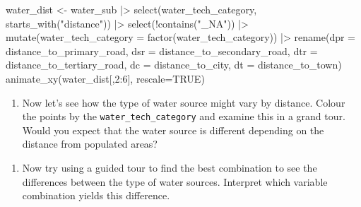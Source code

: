 \documentclass[
  letterpaper,
]{krantz}
\newenvironment{Shaded}{\begin{snugshade}}{\end{snugshade}}
\newcommand{\AttributeTok}[1]{\textcolor[rgb]{0.40,0.45,0.13}{#1}}
\newcommand{\ConstantTok}[1]{\textcolor[rgb]{0.56,0.35,0.01}{#1}}
\newcommand{\DecValTok}[1]{\textcolor[rgb]{0.68,0.00,0.00}{#1}}
\newcommand{\FunctionTok}[1]{\textcolor[rgb]{0.28,0.35,0.67}{#1}}
\newcommand{\NormalTok}[1]{\textcolor[rgb]{0.00,0.23,0.31}{#1}}
\newcommand{\OtherTok}[1]{\textcolor[rgb]{0.00,0.23,0.31}{#1}}
\newcommand{\SpecialCharTok}[1]{\textcolor[rgb]{0.37,0.37,0.37}{#1}}
\newcommand{\StringTok}[1]{\textcolor[rgb]{0.13,0.47,0.30}{#1}}
\providecommand{\tightlist}{%
  \setlength{\itemsep}{0pt}\setlength{\parskip}{0pt}}
\begin{document}
\begin{Shaded}
\begin{Highlighting}[]
\NormalTok{water\_dist }\OtherTok{\textless{}{-}}\NormalTok{ water\_sub }\SpecialCharTok{|\textgreater{}}
  \FunctionTok{select}\NormalTok{(water\_tech\_category, }\FunctionTok{starts\_with}\NormalTok{(}\StringTok{"distance"}\NormalTok{)) }\SpecialCharTok{|\textgreater{}}
  \FunctionTok{select}\NormalTok{(}\SpecialCharTok{!}\FunctionTok{contains}\NormalTok{(}\StringTok{"\_NA"}\NormalTok{)) }\SpecialCharTok{|\textgreater{}}
  \FunctionTok{mutate}\NormalTok{(}\AttributeTok{water\_tech\_category =} \FunctionTok{factor}\NormalTok{(water\_tech\_category)) }\SpecialCharTok{|\textgreater{}}
  \FunctionTok{rename}\NormalTok{(}\AttributeTok{dpr =}\NormalTok{ distance\_to\_primary\_road,}
         \AttributeTok{dsr =}\NormalTok{ distance\_to\_secondary\_road,}
         \AttributeTok{dtr =}\NormalTok{ distance\_to\_tertiary\_road,}
         \AttributeTok{dc =}\NormalTok{ distance\_to\_city,}
         \AttributeTok{dt =}\NormalTok{ distance\_to\_town)}
\FunctionTok{animate\_xy}\NormalTok{(water\_dist[,}\DecValTok{2}\SpecialCharTok{:}\DecValTok{6}\NormalTok{], }\AttributeTok{rescale=}\ConstantTok{TRUE}\NormalTok{)}
\end{Highlighting}
\end{Shaded}

\begin{enumerate}
\def\labelenumi{\arabic{enumi}.}
\setcounter{enumi}{2}
\tightlist
\item
  Now let's see how the type of water source might vary by distance.
  Colour the points by the \texttt{water\_tech\_category} and examine
  this in a grand tour. Would you expect that the water source is
  different depending on the distance from populated areas?
\end{enumerate}

\begin{Shaded}
\end{Shaded}

\begin{enumerate}
\def\labelenumi{\arabic{enumi}.}
\setcounter{enumi}{3}
\tightlist
\item
  Now try using a guided tour to find the best combination to see the
  differences between the type of water sources. Interpret which
  variable combination yields this difference.
\end{enumerate}
\end{document}
